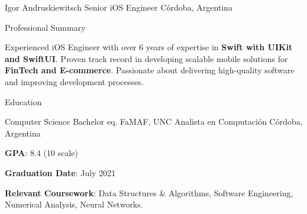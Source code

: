 \documentclass{curriculum}
\begin{document}

\begin{cvheader}

\makeheader
    {Igor Andruskiewitsch}  {}
    {Senior iOS Engineer}    {}
    {C\'ordoba, Argentina}    {}

\end{cvheader}


\begin{cvsection}{Professional Summary}

    \begin{summary}
        Experienced iOS Engineer with over 6 years of expertise in \textbf{Swift with UIKit and SwiftUI}. Proven track record in developing scalable mobile solutions for \textbf{FinTech and E-commerce}. Passionate about delivering high-quality software and improving development processes.
    \end{summary}

\end{cvsection}



\begin{cvsection}{Education}

    \makesectionitemheader
        {Computer Science Bachelor eq.}       {FaMAF, UNC}
        {Analista en Computación}             {C\'ordoba, Argentina}
    \begin{sectionitemlist}
        \item {\textbf{GPA}: 8.4 (10 scale)}
        \item {\textbf{Graduation Date}: July 2021}
        \item {\textbf{Relevant Coursework}: Data Structures \& Algorithms, Software Engineering, Numerical Analysis, Neural Networks.}
    \end{sectionitemlist}

\end{cvsection}
\end{document}
